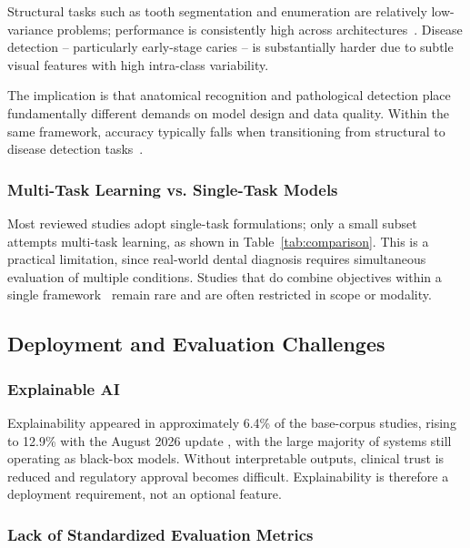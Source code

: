 \documentclass[conference]{IEEEtran}
\begin{document}
Structural tasks such as tooth segmentation and enumeration are
relatively low-variance problems; performance is consistently high
across architectures~\cite{bonfanti2025deep}. Disease detection --
particularly early-stage caries -- is substantially harder due to subtle
visual features with high intra-class variability.

The implication is that anatomical recognition and pathological detection
place fundamentally different demands on model design and data quality.
Within the same framework, accuracy typically falls when transitioning
from structural to disease detection tasks~\cite{nassiri2025yolo}.

\subsubsection{Multi-Task Learning vs. Single-Task Models}

Most reviewed studies adopt single-task formulations;
only a small subset attempts multi-task learning, as shown in
Table~\ref{tab:comparison}. This is a practical limitation, since
real-world dental diagnosis requires simultaneous evaluation of multiple
conditions. Studies that do combine objectives within a single
framework~\cite{chen2023deep} remain rare and are often restricted in
scope or modality.

\subsection{Deployment and Evaluation Challenges}

\subsubsection{Explainable AI}

Explainability appeared in approximately 6.4\% of the base-corpus
studies, rising to 12.9\% with the August 2026 update
\cite{chen2023deep,zhu2026dentfound,george2026explainable}, with the
large majority of systems still operating as black-box models.
Without interpretable outputs, clinical trust is reduced and
regulatory approval becomes difficult. Explainability is therefore a
deployment requirement, not an optional feature.

\subsubsection{Lack of Standardized Evaluation Metrics}
\end{document}
